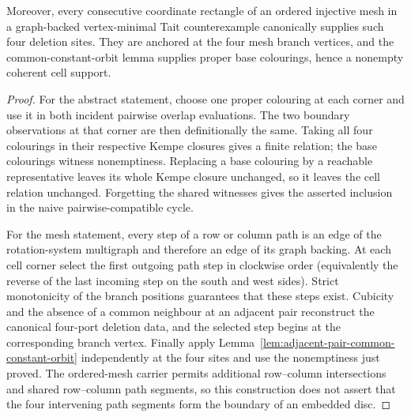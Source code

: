 \begin{lemma}
Moreover, every consecutive coordinate rectangle of an ordered injective mesh in a
graph-backed vertex-minimal Tait counterexample canonically supplies such
four deletion sites.  They are anchored at the four mesh branch vertices,
and the common-constant-orbit lemma supplies proper base colourings, hence a
nonempty coherent cell support.
\end{lemma}

\begin{proof}
For the abstract statement, choose one proper colouring at each corner and
use it in both incident pairwise overlap evaluations.  The two boundary
observations at that corner are then definitionally the same.  Taking all
four colourings in their respective Kempe closures gives a finite relation;
the base colourings witness nonemptiness.  Replacing a base colouring by a
reachable representative leaves its whole Kempe closure unchanged, so it
leaves the cell relation unchanged.  Forgetting the shared witnesses gives
the asserted inclusion in the naive pairwise-compatible cycle.

For the mesh statement, every step of a row or column path is an edge of the
rotation-system multigraph and therefore an edge of its graph backing.  At
each cell corner select the first outgoing path step in clockwise order
(equivalently the reverse of the last incoming step on the south and west
sides).  Strict monotonicity of the branch positions guarantees that these
steps exist.  Cubicity and the absence of a common neighbour at an adjacent
pair reconstruct the canonical four-port deletion data, and the selected
step begins at the corresponding branch vertex.  Finally apply
Lemma~\ref{lem:adjacent-pair-common-constant-orbit} independently at the four
sites and use the nonemptiness just proved.  The ordered-mesh carrier permits
additional row--column intersections and shared row--column path segments,
so this construction does not assert that the four intervening path segments
form the boundary of an embedded disc.
\end{proof}

